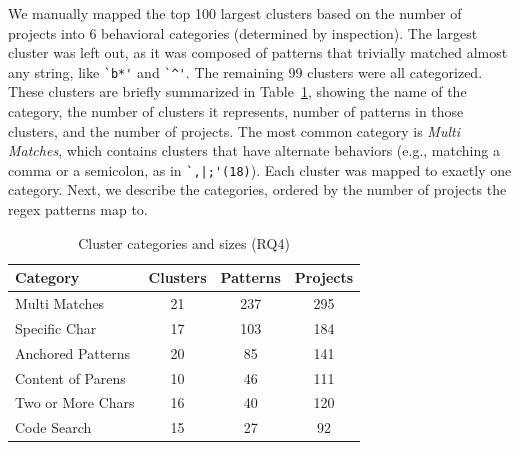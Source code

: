 We manually mapped the top 100 largest clusters based on the number of projects into 6 behavioral categories (determined by inspection).  The largest cluster was left out, as it was composed of patterns that trivially matched almost any string, like \verb!`b*'! and \verb!`^'!.  The remaining 99 clusters were all categorized. These clusters are briefly summarized in Table~\ref{tab:clustercats}, showing the name of the category, the number of clusters it represents, number of patterns in those clusters, and the number of projects. The most common category is \emph{Multi Matches}, which contains clusters that have alternate behaviors (e.g., matching a comma or a semicolon, as in \verb!`,|;'(18)!). Each cluster was mapped to exactly one category. Next, we describe the categories, ordered by the number of projects the regex patterns map to.


\begin{table}
\begin{center}
\begin{small}

\caption{Cluster categories and sizes (RQ4) \label{tab:clustercats}}
\begin{tabular}{lccc}
\toprule
\textbf{Category} & \textbf{Clusters} & \textbf{Patterns} & \textbf{Projects} \\  \hline \bigstrut
Multi Matches & 21 & 237 & 295\\
\hline \bigstrut
Specific Char & 17 & 103 & 184\\
\hline \bigstrut
Anchored Patterns & 20 & 85 & 141\\
\hline \bigstrut
 Content of Parens & 10 & 46 & 111\\
\hline \bigstrut
Two or More Chars & 16 & 40 & 120\\
\hline \bigstrut
Code Search & 15 & 27 & 92 \\
\bottomrule
\end{tabular}
\vspace{-12pt}
\end{small}
\end{center}
\end{table}

